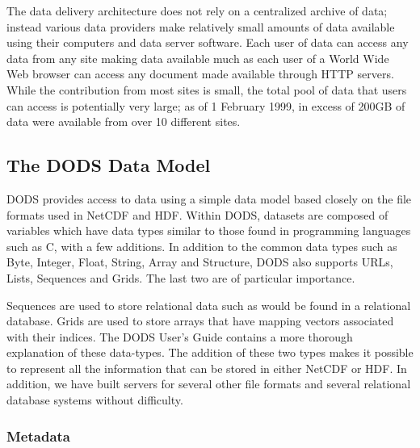 \documentclass[12pt]{article}
\begin{document}
The data delivery architecture does not rely on a centralized archive of
data; instead various data providers make relatively small amounts of data
available using their computers and data server software. Each user of data
can access any data from any site making data available much as
each user of a World Wide Web browser can access any document made available
through \acs{HTTP} servers. While the contribution from most sites is small,
the total pool of data that users can access is potentially very large; as of
1 February 1999, in excess of 200GB of data were available from over 10 different
sites.

\subsection{The DODS Data Model}
\label{dm}

\ac{DODS} provides access to data using a simple data model based closely on
the file formats used in \acs{NetCDF} and \acs{HDF}. Within \ac{DODS},
datasets are composed of variables which have data types similar to those
found in programming languages such as C, with a few additions. In addition
to the common data types such as Byte, Integer, Float, String, Array and
Structure, \ac{DODS} also supports \acs{URL}s, Lists, Sequences and Grids.
The last two are of particular importance.

Sequences are used to store relational data such as would be found in a
relational database. Grids are used to store arrays that have mapping vectors
associated with their indices. The \ac{DODS} User's Guide
\cite{dods:users-guide} contains a more thorough explanation of these
data-types.  The addition of these two types makes it possible to represent
all the information that can be stored in either \acs{NetCDF} or \acs{HDF}.
In addition, we have built servers for several other file formats and several
relational database systems without difficulty.

\subsubsection{Metadata}
\label{md}
\end{document}
